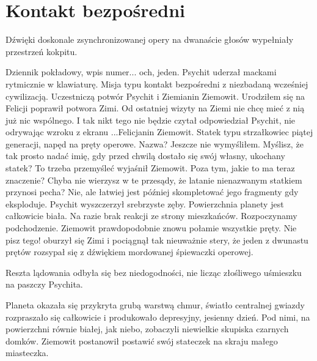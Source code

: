 \chapter{Kontakt bezpośredni}


Dźwięki doskonale zsynchronizowanej opery na dwanaście głosów wypełniały przestrzeń kokpitu.

\begin{dialogue}
\ds{} Dziennik pokładowy, wpis numer... och, jeden. \dm{} Psychit uderzał mackami rytmicznie w klawiaturę. \dm{}
Misja typu kontakt bezpośredni z niezbadaną wcześniej cywilizacją. Uczestniczą potwór Psychit i Ziemianin Ziemowit.
\ds{} Urodziłem się na Felicji \dm{} poprawił potwora Zimi. \dm{} Od ostatniej wizyty na Ziemi nie chcę mieć z nią już nic wspólnego.
\ds{} I tak nikt tego nie będzie czytał \dm{} odpowiedział Psychit, nie odrywając wzroku z ekranu \dm{} ...Felicjanin Ziemowit.
Statek typu strzałkowiec piątej generacji, napęd na pręty operowe. Nazwa?
\ds{} Jeszcze nie wymyśliłem. Myślisz, że tak prosto nadać imię, gdy przed chwilą dostało się swój własny, ukochany statek? To trzeba przemyśleć \dm{}
wyjaśnił Ziemowit. \dm{} Poza tym, jakie to ma teraz znaczenie? Chyba nie wierzysz w te przesądy, że latanie nienazwanym statkiem przynosi pecha?
\ds{} Nie, ale łatwiej jest później skompletować jego fragmenty gdy eksploduje. \dm{} Psychit wyszczerzył srebrzyste zęby. \dm{}
Powierzchnia planety jest całkowicie biała. Na razie brak reakcji ze strony mieszkańców. Rozpoczynamy podchodzenie.
Ziemowit prawdopodobnie znowu połamie wszystkie pręty.
\ds{} Nie pisz tego! \dm{} oburzył się Zimi i pociągnął tak nieuważnie stery, że jeden z dwunastu prętów rozsypał się z dźwiękiem mordowanej śpiewaczki operowej.
\end{dialogue}

Reszta lądowania odbyła się bez niedogodności, nie licząc złośliwego uśmieszku na paszczy Psychita.

\divider{}

Planeta okazała się przykryta grubą warstwą chmur, światło centralnej gwiazdy rozpraszało się całkowicie i produkowało depresyjny, jesienny dzień.
Pod nimi, na powierzchni równie białej, jak niebo, zobaczyli niewielkie skupiska czarnych domków. 
Ziemowit postanowił postawić swój stateczek na skraju małego miasteczka.

